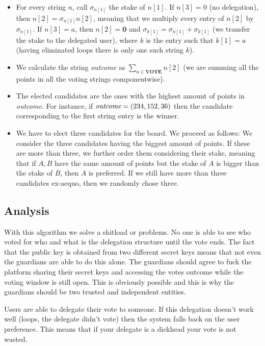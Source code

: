 \documentclass[submission, copyright,creativecommons,sharealike,noncommercial]{eptcs}
\begin{document}
\begin{itemize}
\begin{itemize}
\begin{itemize}
						\item For every string $n$, call $\sigma_{n[1]}$ the stake of $n[1]$. If $n[3] = 0$ (no delegation), then $n[2] = \sigma_{n[1]} n[2]$, meaning that we multiply every entry of $n[2]$ by $\sigma_{n[1]}$. If $n[3] = a$, then $n[2] = \mathbf{0}$ and $\sigma_{k[1]} = \sigma_{n[1]} + \sigma_{k[1]}$ (we transfer the stake to the delegated user), where $k$ is the entry such that $k[1] = a$ (having eliminated loops there is only one such string $k$).
						
						
						\item We calculate the string \emph{outcome} as $\sum_{n \in \textbf{VOTE}} n[2]$ (we are summing all the points in all the voting strings componentwise).
						
						\item The elected candidates are the ones with the highest amount of points in \emph{outcome}. For instance, if $\emph{outcome} = (234, 152, 36)$ then the candidate corresponding to the first string entry is the winner.
						
						\item We have to elect three candidates for the board. We proceed as follows: We consider the three candidates having the biggest amount of points. If these are more than three, we further order them considering their stake, meaning that if $A,B$ have the same amount of points but the stake of $A$ is bigger than the stake of $B$, then $A$ is preferred. If we still have more than three candidates ex-aequo, then we randomly chose three.
					\end{itemize}
				\end{itemize}
			\end{itemize}

	\subsection{Analysis}
		With this algorithm we solve a shitload or problems. No one is able to see who voted for who and what is the delegation structure until the vote ends. The fact that the public key is obtained from two different secret keys means that not even the guardians are able to do this alone. The guardians should agree to fuck the platform sharing their secret keys and accessing the votes outcome while the voting window is still open. This is obviously possible and this is why the guardians should be two trusted and independent entities.
		
		Users are able to delegate their vote to someone. If this delegation doesn't work well (loops, the delegate didn't vote) then the system falls back on the user preference. This means that if your delegate is a dickhead your vote is not wasted.
		
\end{document}
